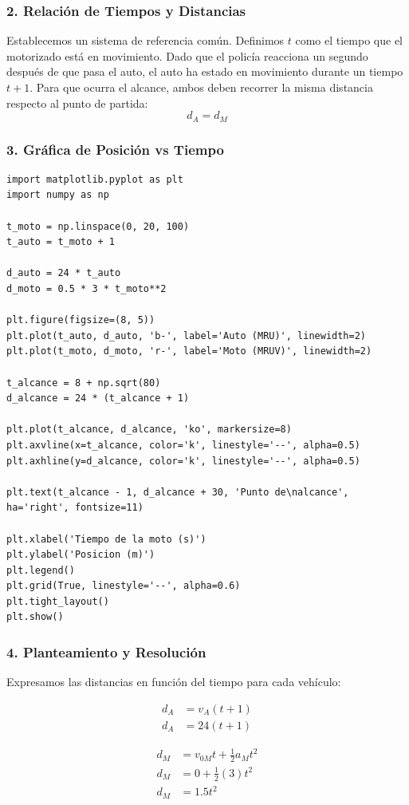 \documentclass[12pt, a4paper]{article}
\begin{document}
\subsubsection*{2. Relación de Tiempos y Distancias}
Establecemos un sistema de referencia común. Definimos $t$ como el tiempo que el motorizado está en movimiento. Dado que el policía reacciona un segundo después de que pasa el auto, el auto ha estado en movimiento durante un tiempo $t + 1$.
Para que ocurra el alcance, ambos deben recorrer la misma distancia respecto al punto de partida:
$$ d_A = d_M $$

\subsubsection*{3. Gráfica de Posición vs Tiempo}
\begin{lstlisting}
import matplotlib.pyplot as plt
import numpy as np

t_moto = np.linspace(0, 20, 100)
t_auto = t_moto + 1

d_auto = 24 * t_auto
d_moto = 0.5 * 3 * t_moto**2

plt.figure(figsize=(8, 5))
plt.plot(t_auto, d_auto, 'b-', label='Auto (MRU)', linewidth=2)
plt.plot(t_moto, d_moto, 'r-', label='Moto (MRUV)', linewidth=2)

t_alcance = 8 + np.sqrt(80)
d_alcance = 24 * (t_alcance + 1)

plt.plot(t_alcance, d_alcance, 'ko', markersize=8)
plt.axvline(x=t_alcance, color='k', linestyle='--', alpha=0.5)
plt.axhline(y=d_alcance, color='k', linestyle='--', alpha=0.5)

plt.text(t_alcance - 1, d_alcance + 30, 'Punto de\nalcance', ha='right', fontsize=11)

plt.xlabel('Tiempo de la moto (s)')
plt.ylabel('Posicion (m)')
plt.legend()
plt.grid(True, linestyle='--', alpha=0.6)
plt.tight_layout()
plt.show()
\end{lstlisting}

\subsubsection*{4. Planteamiento y Resolución}
Expresamos las distancias en función del tiempo para cada vehículo:

\begin{align*}
d_A &= v_A (t + 1) \\
d_A &= 24(t + 1)
\end{align*}

\begin{align*}
d_M &= v_{0M} t + \frac{1}{2} a_M t^2 \\
d_M &= 0 + \frac{1}{2}(3) t^2 \\
d_M &= 1.5 t^2
\end{align*}
\end{document}
